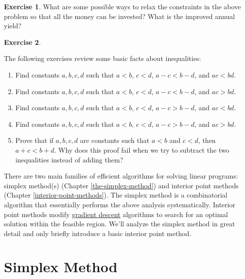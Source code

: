\documentclass[
]{book}
\providecommand{\tightlist}{%
  \setlength{\itemsep}{0pt}\setlength{\parskip}{0pt}}
\theoremstyle{definition}
\theoremstyle{definition}
\theoremstyle{definition}
\newtheorem{exercise}{Exercise}[chapter]
\theoremstyle{definition}
\theoremstyle{remark}
\begin{document}
\begin{exercise}
What are some possible ways to relax the constraints in the above problem so that all the money can be invested? What is the improved annual yield?
\end{exercise}

\begin{exercise}
\protect\hypertarget{exr:inequalities}{}\label{exr:inequalities}

The following exercises review some basic facts about inequalities:

\begin{enumerate}
\def\labelenumi{\arabic{enumi}.}
\tightlist
\item
  Find constants \(a, b, c, d\) such that \(a < b\), \(c < d\), \(a - c < b - d\), and \(ac < bd\).
\item
  Find constants \(a, b, c, d\) such that \(a < b\), \(c < d\), \(a - c < b - d\), and \(ac > bd\).
\item
  Find constants \(a, b, c, d\) such that \(a < b\), \(c < d\), \(a - c > b - d\), and \(ac < bd\).
\item
  Find constants \(a, b, c, d\) such that \(a < b\), \(c < d\), \(a - c > b - d\), and \(ac > bd\).
\item
  Prove that if \(a, b, c, d\) are constants such that \(a < b\) and \(c < d\), then \(a + c < b + d\). Why does this proof fail when we try to subtract the two inequalities instead of adding them?
\end{enumerate}

\end{exercise}

There are two main families of efficient algorithms for solving linear programs: simplex method(s) (Chapter \ref{the-simplex-method}) and interior point methods (Chapter \ref{interior-point-methods}).
The simplex method is a combinatorial algorithm that essentially performs the above analysis systematically.
Interior point methods modify \href{https://en.wikipedia.org/wiki/Gradient_descent}{gradient descent} algorithms to search for an optimal solution within the feasible region. We'll analyze the simplex method in great detail and only briefly introduce a basic interior point method.

\hypertarget{part-simplex-method}{%
\part{Simplex Method}\label{part-simplex-method}}
\end{document}
